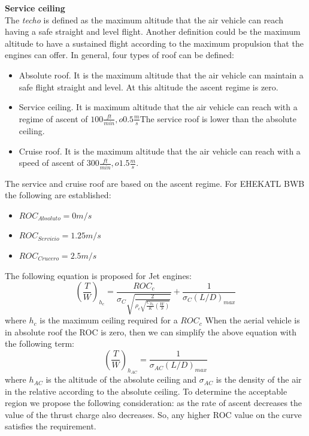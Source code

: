 \bigskip
\textbf{Service ceiling}\\
The \textit{techo} is defined as the maximum altitude that the air vehicle can reach having a safe straight and level flight. Another definition could be the maximum altitude to have a sustained flight according to the maximum propulsion that the engines can offer. In general, four types of roof can be defined:
\begin{itemize}
    \item Absolute roof. It is the maximum altitude that the air vehicle can maintain a safe flight straight and level. At this altitude the ascent regime is zero. 
    \item Service ceiling. It is maximum altitude that the air vehicle can reach with a regime of ascent of $100 \frac{ft}{min}, o 0.5 \frac{m}{s}$The service roof is lower than the absolute ceiling. 
    \item Cruise roof. It is the maximum altitude that the air vehicle can reach with a speed of ascent of $300 \frac{ft}{min}, o 1.5 \frac{m}{s}$.
\end{itemize}
The service and cruise roof are based on the ascent regime. For EHEKATL BWB the following are established: 
\begin{itemize}
    \item[] $ROC_{Absoluto} = 0 m/s$
    \item[] $ROC_{Servicio} = 1.25 m/s$
    \item[] $ROC_{Crucero} = 2.5 m/s$
\end{itemize}
The following equation is proposed for Jet engines:
\begin{equation}
    (\frac{T}{W})_{h_c} = \frac{ROC_c}{\sigma_C  \sqrt{\frac{2}{\rho_c \sqrt{\frac{C_{D_0}}{K} (\frac{W}{S})}}}} + \frac{1}{\sigma_C (L/D)_{max}}
\end{equation}
where $h_c$ is the maximum ceiling required for a $ROC_c$ When the aerial vehicle is in absolute roof the ROC is zero, then we can simplify the above equation with the following term:
\begin{equation}
    (\frac{T}{W})_{h_{AC}} = \frac{1}{\sigma_{AC} (L/D)_{max}}
\end{equation}
where $h_{AC}$ is the altitude of the absolute ceiling and $\sigma_{AC}$ is the density of the air in the relative according to the absolute ceiling. To determine the acceptable region we propose the following consideration: as the rate of ascent decreases the value of the thrust charge also decreases. So, any higher ROC value on the curve satisfies the requirement. 
